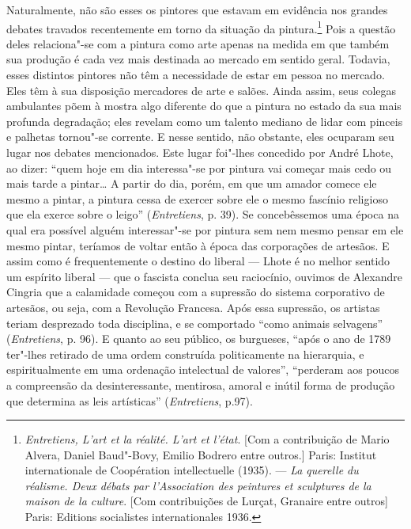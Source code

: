 Naturalmente, não são esses os pintores que estavam em evidência nos
grandes debates travados recentemente em torno da situação da
pintura.\footnote{\emph{Entretiens, L'art et la réalité. L'art et
  l'état}. {[}Com a contribuição de Mario Alvera, Daniel Baud"-Bovy,
  Emilio Bodrero entre outros.{]} Paris: Institut internationale de
  Coopération intellectuelle (1935). --- \emph{La querelle du réalisme.
  Deux débats par l'Association des peintures et sculptures de la maison
  de la culture}. {[}Com contribuições de Lurçat, Granaire entre
  outros{]} Paris: Editions socialistes internationales 1936.} Pois a
questão deles relaciona"-se com a pintura como arte apenas na medida em
que também sua produção é cada vez mais destinada ao mercado em sentido
geral. Todavia, esses distintos pintores não têm a necessidade de estar
em pessoa no mercado. Eles têm à sua disposição mercadores de arte e
salões. Ainda assim, seus colegas ambulantes põem à mostra algo
diferente do que a pintura no estado da sua mais profunda degradação;
eles revelam como um talento mediano de lidar com pinceis e palhetas
tornou"-se corrente. E nesse sentido, não obstante, eles ocuparam seu
lugar nos debates mencionados. Este lugar foi"-lhes concedido por André
Lhote, ao dizer: ``quem hoje em dia interessa"-se por pintura vai começar
mais cedo ou mais tarde a pintar\ldots{} A partir do dia, porém, em que um
amador comece ele mesmo a pintar, a pintura cessa de exercer sobre ele o
mesmo fascínio religioso que ela exerce sobre o leigo''
(\emph{Entretiens}, p. 39). Se concebêssemos uma época na qual era
possível alguém interessar"-se por pintura sem nem mesmo pensar em ele
mesmo pintar, teríamos de voltar então à época das corporações de
artesãos. E assim como é frequentemente o destino do liberal --- Lhote é
no melhor sentido um espírito liberal --- que o fascista conclua seu
raciocínio, ouvimos de Alexandre Cingria que a calamidade começou com a
supressão do sistema corporativo de artesãos, ou seja, com a Revolução
Francesa. Após essa supressão, os artistas teriam desprezado toda
disciplina, e se comportado ``como animais selvagens''
(\emph{Entretiens}, p. 96). E quanto ao seu público, os burgueses,
``após o ano de 1789 ter"-lhes retirado de uma ordem construída
politicamente na hierarquia, e espiritualmente em uma ordenação
intelectual de valores'', ``perderam aos poucos a compreensão da
desinteressante, mentirosa, amoral e inútil forma de produção que
determina as leis artísticas'' (\emph{Entretiens}, p.97).

